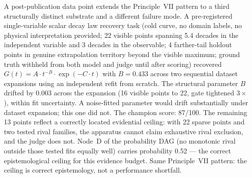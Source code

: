 \documentclass[11pt]{article}
\begin{document}
A post-publication data point extends the Principle~VII pattern to a third structurally distinct substrate and a different failure mode. A pre-registered single-variable scalar decay law recovery task (cold curve, no domain labels, no physical interpretation provided; 22 visible points spanning 5.4 decades in the independent variable and 3 decades in the observable; 4 farther-tail holdout points in genuine extrapolation territory beyond the visible maximum; ground truth withheld from both model and judge until after scoring) recovered $G(t) = A \cdot t^{-B} \cdot \exp(-C \cdot t)$ with $B = 0.433$ across two sequential dataset expansions using an independent refit from scratch. The structural parameter $B$ drifted by $0.003$ across the expansion (16 visible points to 22, gate tightened $3\times$), within fit uncertainty. A noise-fitted parameter would drift substantially under dataset expansion; this one did not. The champion score: 87/100. The remaining 13 points reflect a correctly located evidential ceiling: with 22 sparse points and two tested rival families, the apparatus cannot claim exhaustive rival exclusion, and the judge does not. Node~D of the probability DAG (no monotonic rival outside those tested fits equally well) carries probability 0.52 — the correct epistemological ceiling for this evidence budget. Same Principle~VII pattern: the ceiling is correct epistemology, not a performance shortfall.
\end{document}
